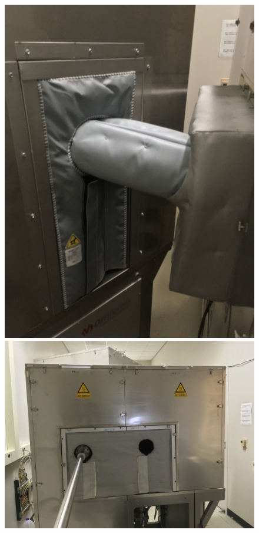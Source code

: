 \begin{enumerate}
\begin{figure}[H]
\begin{minipage}[c]{0.33\linewidth}
		\includegraphics[width=1\textwidth, angle=270]{panels6.jpg}
	\end{minipage}\hfill\vfill
	\begin{minipage}[c]{0.33\linewidth}
		\centering
		\includegraphics[width=1\textwidth]{panels7.jpg}

\end{minipage}
\end{figure}
\end{enumerate}
